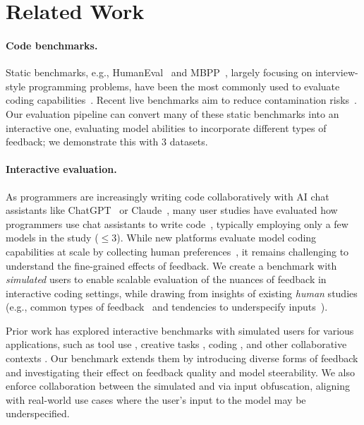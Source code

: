 \section{Related Work}

\paragraph{Code benchmarks.}
Static benchmarks, e.g., HumanEval~\citep{chen2021evaluating} and MBPP~\citep{austin2021program}, largely focusing on interview-style programming problems, have been the most commonly used to evaluate coding capabilities~\citep{lu2021codexglue, nijkamp2022codegen,zhu2022xlcost, wang2022recode, liu2023your, jimenez2023swe, khan2023xcodeeval,yan2023codescope, cassano2023multipl, muennighoff2023octopack, dinh2023large,yang2023intercode, du2023classeval}. 
Recent live benchmarks aim to reduce contamination risks~\citep{jain2024livecodebench,white2024livebench}.
Our evaluation pipeline can convert many of these static benchmarks into an interactive one, evaluating model abilities to incorporate different types of feedback; we demonstrate this with $3$ datasets.



\paragraph{Interactive evaluation.}
As programmers are increasingly writing code collaboratively with AI chat assistants like ChatGPT~\cite{chatgpt} or Claude~\cite{claude}, many user studies have evaluated how programmers use chat assistants to write code~\citep{ross2023programmer, chopra2023conversational, kazemitabaar2023studying,xiao2023devgpt,nam2024using,mozannar2024realhumaneval,chidambaram2024socratic}, typically employing only a few models in the study ($\leq 3$).
While new platforms evaluate model coding capabilities at scale by collecting human preferences~\citep{chiang2024chatbot, chi2024copilot}, it remains challenging to understand the fine-grained effects of feedback.
We create a benchmark with \emph{simulated} users to enable scalable evaluation of the nuances of feedback in interactive coding settings, while drawing from insights of existing \emph{human} studies (e.g., common types of feedback~\citep{chidambaram2024socratic}  and tendencies to underspecify inputs~\citep{xiao2023devgpt}).


Prior work has explored interactive benchmarks with simulated users for various applications, such as tool use \citep{yao2024taubenchbenchmarktoolagentuserinteraction}, creative tasks \citep{jia2024simulbenchevaluatinglanguagemodels},  coding \citep{wang2024mintevaluatingllmsmultiturn, shao2025collaborativegymframeworkenabling}, and other collaborative contexts \citep{wu2023autogenenablingnextgenllm}. 
Our benchmark extends them by introducing diverse forms of \user{} feedback and investigating their effect on feedback quality and model steerability. 
We also enforce collaboration between the simulated \user{} and \cm{} via input obfuscation, aligning with real-world use cases where the user's input to the model may be underspecified.

